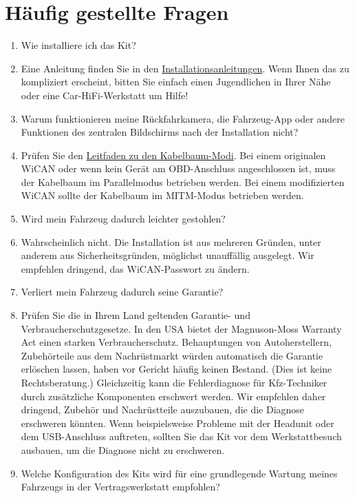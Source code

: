 \documentclass[superscriptaddress,onecolumn,floatfix]{revtex4-2}
\begin{document}
\section{Häufig gestellte Fragen}
\begin{enumerate}
  \item[Frage:] Wie installiere ich das Kit?
  \item[Antwort:] Eine Anleitung finden Sie in den \href{https://github.com/tylerharvey/Ioniq5_CAN/blob/main/guides/}{Installationsanleitungen}. Wenn Ihnen das zu kompliziert erscheint, bitten Sie einfach einen Jugendlichen in Ihrer Nähe oder eine Car-HiFi-Werkstatt um Hilfe!
  \item[Frage:] Warum funktionieren meine Rückfahrkamera, die Fahrzeug-App oder andere Funktionen des zentralen Bildschirms nach der Installation nicht?
  \item[Antwort:] Prüfen Sie den \href{https://github.com/tylerharvey/Ioniq5_CAN/blob/main/guides/harnesses/head_unit_MITM/MITM_harness_modes.pdf}{Leitfaden zu den Kabelbaum-Modi}. Bei einem originalen WiCAN oder wenn kein Gerät am OBD-Anschluss angeschlossen ist, muss der Kabelbaum im Parallelmodus betrieben werden. Bei einem modifizierten WiCAN sollte der Kabelbaum im MITM-Modus betrieben werden.
  \item[Frage:] Wird mein Fahrzeug dadurch leichter gestohlen?
  \item[Antwort:] Wahrscheinlich nicht. Die Installation ist aus mehreren Gründen, unter anderem aus Sicherheitsgründen, möglichst unauffällig ausgelegt. Wir empfehlen dringend, das WiCAN-Passwort zu ändern.
  \item[Frage:] Verliert mein Fahrzeug dadurch seine Garantie?
  \item[Antwort:] Prüfen Sie die in Ihrem Land geltenden Garantie- und Verbraucherschutzgesetze. In den USA bietet der Magnuson-Moss Warranty Act einen starken Verbraucherschutz. Behauptungen von Autoherstellern, Zubehörteile aus dem Nachrüstmarkt würden automatisch die Garantie erlöschen lassen, haben vor Gericht häufig keinen Bestand. (Dies ist keine Rechtsberatung.) Gleichzeitig kann die Fehlerdiagnose für Kfz-Techniker durch zusätzliche Komponenten erschwert werden. Wir empfehlen daher dringend, Zubehör und Nachrüstteile auszubauen, die die Diagnose erschweren könnten. Wenn beispielsweise Probleme mit der Headunit oder dem USB-Anschluss auftreten, sollten Sie das Kit vor dem Werkstattbesuch ausbauen, um die Diagnose nicht zu erschweren.
  \item[Frage:] Welche Konfiguration des Kits wird für eine grundlegende Wartung meines Fahrzeugs in der Vertragswerkstatt empfohlen?

\end{enumerate}
\end{document}
